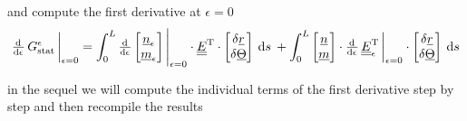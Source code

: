 \begin{frame}
  \vspace{0.5em}
  and compute the first derivative at $\epsilon = 0$
  \begin{displaymath}
    \od{}{\epsilon} \, G_{\text{stat}}^{\epsilon} \sVert[3]_{\epsilon=0} =
    \int_0^L \od{}{\epsilon}
      \begin{bmatrix}
        \underline{n}_{\epsilon} \\ \underline{m}_{\epsilon}
      \end{bmatrix} \sVert[4]_{\epsilon=0} \cdot
      \doubleunderline{E}^{\mathrm{T}} \cdot
      \begin{bmatrix}
        \delta \underline{r} \\ \delta \underline{\Theta}
      \end{bmatrix}
    \: \dif s \: +
    \int_0^L 
      \begin{bmatrix}
        \underline{n} \\ \underline{m}
      \end{bmatrix} \cdot
      \od{}{\epsilon} \, \doubleunderline{E}_{\epsilon}^{\mathrm{T}} \sVert[3]_{\epsilon=0} \cdot
      \begin{bmatrix}
        \delta \underline{r} \\ \delta \underline{\Theta}
      \end{bmatrix}
    \: \dif s
  \end{displaymath}
  
  \vspace{1em}
  in the sequel we will compute the individual terms of the first derivative step by step and then recompile the results

\end{frame}



